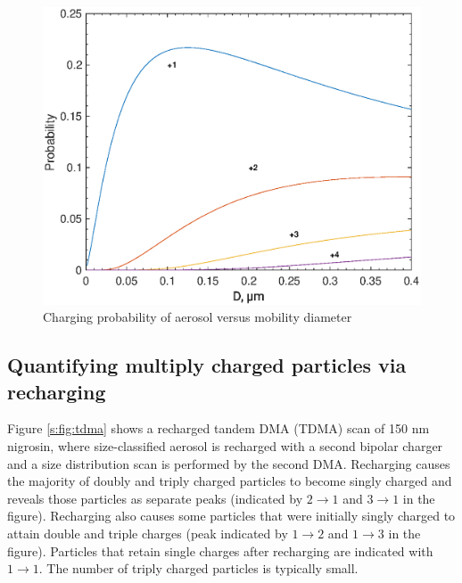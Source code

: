 \documentclass[12pt]{article}
\begin{document}
\begin{figure}[htp]
\centering
\includegraphics[scale=0.7]{images/fig_supp_probability.eps}
\caption{Charging probability of aerosol versus mobility diameter}
\label{s:fig:probability}
\end{figure}

\subsection{Quantifying multiply charged particles via recharging}

Figure \ref{s:fig:tdma} shows a recharged tandem DMA (TDMA) scan of 150 nm nigrosin, where size-classified aerosol is recharged with a second bipolar charger and a size distribution scan is performed by the second DMA. Recharging causes the majority of doubly and triply charged particles to become singly charged and reveals those particles as separate peaks (indicated by $2\rightarrow 1$ and $3\rightarrow 1$ in the figure). Recharging also causes some particles that were initially singly charged to attain double and triple charges (peak indicated by $1\rightarrow 2$ and $1\rightarrow 3$ in the figure). Particles that retain single charges after recharging are indicated with $1\rightarrow 1$. The number of triply charged particles is typically small. 
\end{document}
